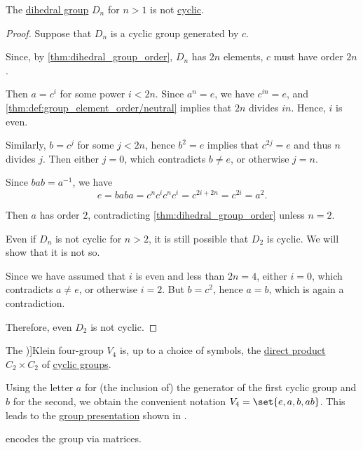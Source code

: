\begin{proposition}\label{thm:dihedral_group_not_cyclic}
  The \hyperref[def:dihedral_group]{dihedral group} \( D_n \) for \( n > 1 \) is not \hyperref[def:cyclic_group]{cyclic}.
\end{proposition}
\begin{proof}
  Suppose that \( D_n \) is a cyclic group generated by \( c \).

  Since, by \cref{thm:dihedral_group_order}, \( D_n \) has \( 2n \) elements, \( c \) must have order \( 2n \).

  Then \( a = c^i \) for some power \( i < 2n \). Since \( a^n = e \), we have \( c^{in} = e \), and \cref{thm:def:group_element_order/neutral} implies that \( 2n \) divides \( in \). Hence, \( i \) is even.

  Similarly, \( b = c^j \) for some \( j < 2n \), hence \( b^2 = e \) implies that \( c^{2j} = e \) and thus \( n \) divides \( j \). Then either \( j = 0 \), which contradicts \( b \neq e \), or otherwise \( j = n \).

  Since \( bab = a^{-1} \), we have
  \begin{equation*}
    e = baba = c^n c^i c^n c^i = c^{2i + 2n} = c^{2i} = a^2.
  \end{equation*}

  Then \( a \) has order \( 2 \), contradicting \cref{thm:dihedral_group_order} unless \( n = 2 \).

  Even if \( D_n \) is not cyclic for \( n > 2 \), it is still possible that \( D_2 \) is cyclic. We will show that it is not so.

  Since we have assumed that \( i \) is even and less than \( 2n = 4 \), either \( i = 0 \), which contradicts \( a \neq e \), or otherwise \( i = 2 \). But \( b = c^2 \), hence \( a = b \), which is again a contradiction.

  Therefore, even \( D_2 \) is not cyclic.
\end{proof}

\begin{definition}\label{def:klein_four_group}
  The \term[ru=четверная группа Клейна (\cite[189]{Винберг2014КурсАлгебры})]{Klein four-group} \( V_4 \) is, up to a choice of symbols, the \hyperref[def:first_order_direct_product]{direct product} \( C_2 \times C_2 \) of \hyperref[def:cyclic_group]{cyclic groups}.

  Using the letter \( a \) for (the inclusion of) the generator of the first cyclic group and \( b \) for the second, we obtain the convenient notation \( V_4 = \set{ e, a, b, ab } \). This leads to the \hyperref[def:group_presentation]{group presentation} shown in .
\end{definition}
\begin{comments}
  \item {} encodes the group via matrices.
\end{comments}

